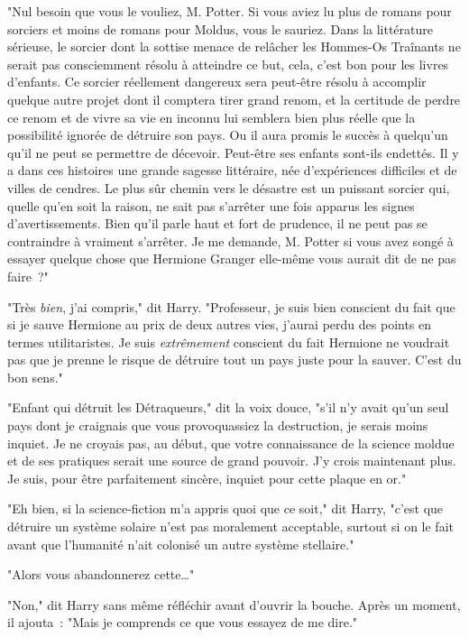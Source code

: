"Nul besoin que vous le vouliez, M. Potter. Si vous aviez lu plus de romans pour sorciers et moins de romans pour Moldus, vous le sauriez. Dans la littérature sérieuse, le sorcier dont la sottise menace de relâcher les Hommes-Os Traînants ne serait pas consciemment résolu à atteindre ce but, cela, c'est bon pour les livres d'enfants. Ce sorcier réellement dangereux sera peut-être résolu à accomplir quelque autre projet dont il comptera tirer grand renom, et la certitude de perdre ce renom et de vivre sa vie en inconnu lui semblera bien plus réelle que la possibilité ignorée de détruire son pays. Ou il aura promis le succès à quelqu'un qu'il ne peut se permettre de décevoir. Peut-être ses enfants sont-ils endettés. Il y a dans ces histoires une grande sagesse littéraire, née d'expériences difficiles et de villes de cendres. Le plus sûr chemin vers le désastre est un puissant sorcier qui, quelle qu'en soit la raison, ne sait pas s'arrêter une fois apparus les signes d'avertissements. Bien qu'il parle haut et fort de prudence, il ne peut pas se contraindre à vraiment s'arrêter. Je me demande, M. Potter si vous avez songé à essayer quelque chose que Hermione Granger elle-même vous aurait dit de ne pas faire~?"

"Très \emph{bien}, j'ai compris," dit Harry. "Professeur, je suis bien conscient du fait que si je sauve Hermione au prix de deux autres vies, j'aurai perdu des points en termes utilitaristes. Je suis \emph{extrêmement} conscient du fait Hermione ne voudrait pas que je prenne le risque de détruire tout un pays juste pour la sauver. C'est du bon sens."

"Enfant qui détruit les Détraqueurs," dit la voix douce, "s'il n'y avait qu'un seul pays dont je craignais que vous provoquassiez la destruction, je serais moins inquiet. Je ne croyais pas, au début, que votre connaissance de la science moldue et de ses pratiques serait une source de grand pouvoir. J'y crois maintenant plus. Je suis, pour être parfaitement sincère, inquiet pour cette plaque en or."

"Eh bien, si la science-fiction m'a appris quoi que ce soit," dit Harry, "c'est que détruire un système solaire n'est pas moralement acceptable, surtout si on le fait avant que l'humanité n'ait colonisé un autre système stellaire."

"Alors vous abandonnerez cette…"

"Non," dit Harry sans même réfléchir avant d'ouvrir la bouche. Après un moment, il ajouta~: "Mais je comprends ce que vous essayez de me dire."

